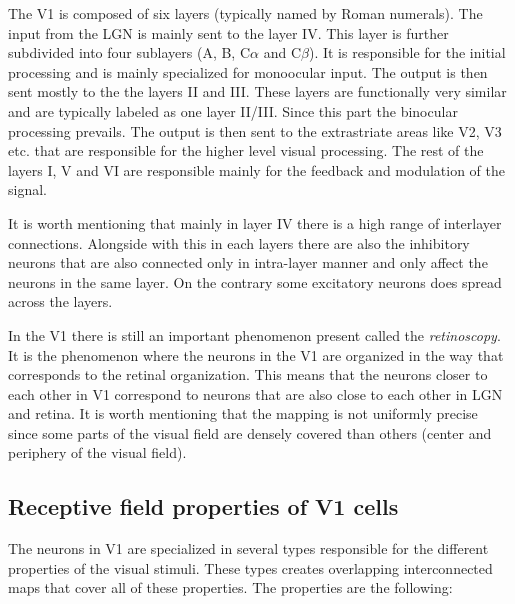 The V1 is composed of six layers (typically named by Roman numerals). The input from 
the LGN is mainly sent to the layer IV. This layer is further subdivided into four 
sublayers (A, B, C$\alpha$ and C$\beta$). It is responsible for the initial processing
and is mainly specialized for monoocular input. The output is then sent mostly to the the 
layers II and III. These layers are functionally very similar and are typically labeled
as one layer II/III. Since this part the binocular processing prevails. The output is
then sent to the extrastriate areas like V2, V3 etc. that are responsible for the higher 
level visual processing. The rest of the layers I, V and VI are responsible mainly for 
the feedback and modulation of the signal. 

It is worth mentioning that mainly in layer IV there is a high range of interlayer connections.
Alongside with this in each layers there are also the inhibitory neurons that are 
also connected only in intra-layer manner and only affect the neurons in the same layer.
On the contrary some excitatory neurons does spread across the layers.

In the V1 there is still an important phenomenon present called the \emph{retinoscopy}.
It is the phenomenon where the neurons in the V1 are organized in the way that 
corresponds to the retinal organization. This means that the neurons closer to each
other in V1 correspond to neurons that are also close to each other in LGN and retina.
It is worth mentioning that the mapping is not uniformly precise since some parts of 
the visual field are densely covered than others (center and periphery of the visual field).

\subsection{Receptive field properties of V1 cells}
\label{subsec:receptive_field}
The neurons in V1 are specialized in several types responsible for the different properties
of the visual stimuli. These types creates overlapping interconnected maps that cover 
all of these properties. The properties are the following:

